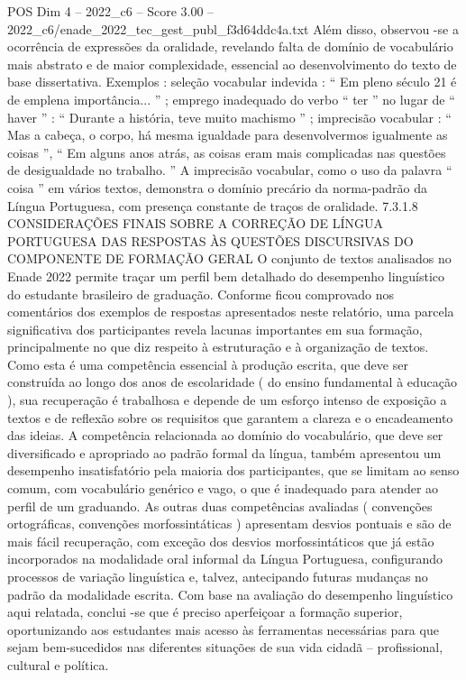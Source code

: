 \begin{textsample}{POS Dim 4 – 2022\_c6 – Score 3.00 – 2022\_c6/enade\_2022\_tec\_gest\_publ\_f3d64ddc4a.txt}
Além disso, observou -se a ocorrência de expressões da oralidade, revelando falta de domínio de vocabulário mais abstrato e de maior complexidade, essencial ao desenvolvimento do texto de base dissertativa.
Exemplos : seleção vocabular indevida : “ Em pleno século 21 é de emplena importância... ” ; emprego inadequado do verbo “ ter ” no lugar de “ haver ” : “ Durante a história, teve muito machismo ” ; imprecisão vocabular : “ Mas a cabeça, o corpo, há mesma igualdade para desenvolvermos igualmente as coisas ”, “ Em alguns anos atrás, as coisas eram mais complicadas nas questões de desigualdade no trabalho. ” A imprecisão vocabular, como o uso da palavra “ coisa ” em vários textos, demonstra o domínio precário da norma-padrão da Língua Portuguesa, com presença constante de traços de oralidade. 7.3.1.8 CONSIDERAÇÕES FINAIS SOBRE A CORREÇÃO DE LÍNGUA PORTUGUESA DAS RESPOSTAS ÀS QUESTÕES DISCURSIVAS DO COMPONENTE DE FORMAÇÃO GERAL O conjunto de textos analisados no Enade 2022 permite traçar um perfil bem detalhado do desempenho linguístico do estudante brasileiro de graduação.
Conforme ficou comprovado nos comentários dos exemplos de respostas apresentados neste relatório, uma parcela significativa dos participantes revela lacunas importantes em sua formação, principalmente no que diz respeito à estruturação e à organização de textos.
Como esta é uma competência essencial à produção escrita, que deve ser construída ao longo dos anos de escolaridade ( do ensino fundamental à educação ), sua recuperação é trabalhosa e depende de um esforço intenso de exposição a textos e de reflexão sobre os requisitos que garantem a clareza e o encadeamento das ideias.
A competência relacionada ao domínio do vocabulário, que deve ser diversificado e apropriado ao padrão formal da língua, também apresentou um desempenho insatisfatório pela maioria dos participantes, que se limitam ao senso comum, com vocabulário genérico e vago, o que é inadequado para atender ao perfil de um graduando.
As outras duas competências avaliadas ( convenções ortográficas, convenções morfossintáticas ) apresentam desvios pontuais e são de mais fácil recuperação, com exceção dos desvios morfossintáticos que já estão incorporados na modalidade oral informal da Língua Portuguesa, configurando processos de variação linguística e, talvez, antecipando futuras mudanças no padrão da modalidade escrita.
Com base na avaliação do desempenho linguístico aqui relatada, conclui -se que é preciso aperfeiçoar a formação superior, oportunizando aos estudantes mais acesso às ferramentas necessárias para que sejam bem-sucedidos nas diferentes situações de sua vida cidadã – profissional, cultural e política.

\end{textsample}
